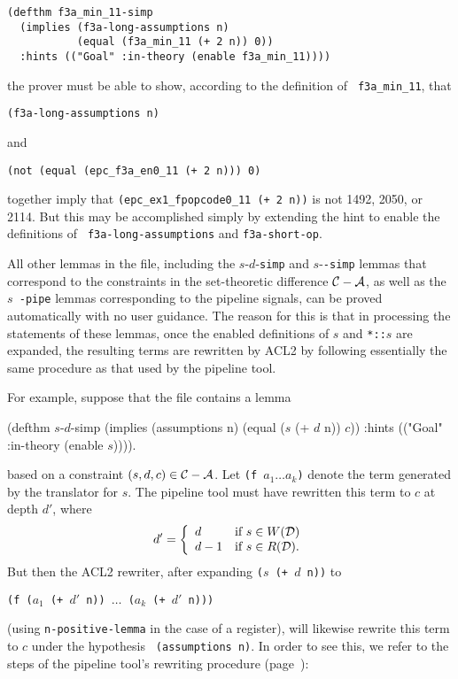 \documentclass{article}
\begin{document}
\begin{verbatim}
(defthm f3a_min_11-simp
  (implies (f3a-long-assumptions n)
           (equal (f3a_min_11 (+ 2 n)) 0))
  :hints (("Goal" :in-theory (enable f3a_min_11))))
\end{verbatim}
the prover must be able to show, according to the definition of {\tt
f3a\verb!_!min\verb!_!11}, that
\begin{center}
{\tt (f3a-long-assumptions n)}
\end{center}
and
\begin{center}
{\tt (not (equal (epc\_f3a\_en0\_11 (+ 2 n))) 0)}
\end{center}
together imply that {\tt (epc\_ex1\_fpopcode0\_11 (+
2 n))} is not 1492, 2050, or 2114.  But this may be accomplished
simply by extending the hint to enable the definitions of {\tt
f3a-long-assumptions} and {\tt f3a-short-op}.

All other lemmas in the file, including the $s$-$d$-{\tt simp} and
$s$-{\tt *-simp} lemmas that correspond to the constraints in the
set-theoretic difference ${\cal C} - {\cal A}$, as well as the $s${\tt
-pipe} lemmas corresponding to the pipeline signals, can be proved
automatically with no user guidance.  The reason for this is that in
processing the statements of these lemmas, once the enabled
definitions of $s$ and \verb!*::!$s$ are expanded, the resulting terms
are rewritten by ACL2 by following essentially the same procedure as
that used by the pipeline tool.

For example, suppose that the file contains a lemma\medskip

\begin{acl2}
(defthm $s$-$d$-simp
  (implies (assumptions n)
           (equal ($s$ (+ $d$ n)) $c$))
 :hints (("Goal" :in-theory (enable $s$)))).
\end{acl2}\noindent
based on a constraint $(s,d,c) \in {\cal C} - {\cal A}$.  
Let {\tt (f $a_1 \ldots a_k$)} denote the term generated by the translator for $s$.
The pipeline tool must have rewritten this term to $c$ at depth $d'$, where
\[d' = \left\{\begin{array}{ll}
         d & \mbox{if $s \in W({\cal D})$}\\
         d-1 & \mbox{if $s \in R({\cal D})$}. \end{array} \right. \]
But then the ACL2 rewriter, after expanding {\tt ($s$ (+ $d$ n))} to
\begin{center}
{\tt (f ($a_1$ (+ $d'$ n)) $\ldots$ ($a_k$ (+ $d'$ n)))}
\end{center}
(using {\tt n-positive-lemma} in the case of a register), will
likewise rewrite this term to $c$ under the hypothesis {\tt
(assumptions n)}.  In order to see this, we refer to the steps of the
pipeline tool's rewriting procedure (page~\pageref{prewrite}):
\end{document}
